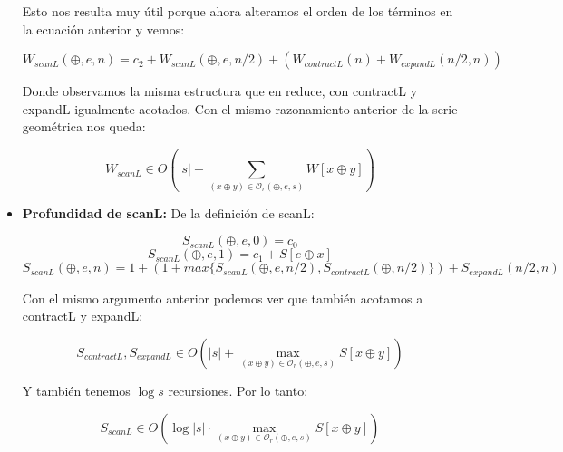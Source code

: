\documentclass[12pt]{article}
\begin{document}
\begin{itemize}
    Esto nos resulta muy útil porque ahora alteramos el orden de los términos en la ecuación anterior y vemos:
    
    $$ W_{scanL}(\oplus, e, n) = c_2 + W_{scanL}(\oplus, e, n/2) + ( W_{contractL}(n) + W_{expandL}(n/2, n) ) $$
    
    Donde observamos la misma estructura que en reduce, con contractL y expandL igualmente acotados. Con el mismo razonamiento anterior de la serie geométrica nos queda:
    
    $$ W_{scanL} \in O(|s| + \sum\limits_{(x\oplus y)\in\mathcal{O}_r(\oplus,e,s)} W[x\oplus y]) $$
    

\item \textbf{Profundidad de scanL:}
    De la definición de scanL:
    
    $$ S_{scanL}(\oplus, e, 0) = c_0 $$
    $$ S_{scanL}(\oplus, e, 1) = c_1 + S[e \oplus x]  $$
    $$ S_{scanL}(\oplus, e, n) = 1 + ( 1 + max\{ S_{scanL}(\oplus, e, n/2), S_{contractL}(\oplus, n/2) \} ) + S_{expandL}(n/2, n) $$
    
    Con el mismo argumento anterior podemos ver que también acotamos a contractL y expandL:
    
    $$ S_{contractL}, S_{expandL} \in O(|s| + \max\limits_{(x\oplus y)\in\mathcal{O}_r(\oplus,e,s)} S[x\oplus y]) $$
    
    Y también tenemos $\log s$ recursiones. Por lo tanto:
    
    $$ S_{scanL} \in O(\log |s|\cdot \max\limits_{(x\oplus y)\in\mathcal{O}_r(\oplus,e,s)} S[x\oplus y]) $$
    
\end{itemize}
\end{document}
